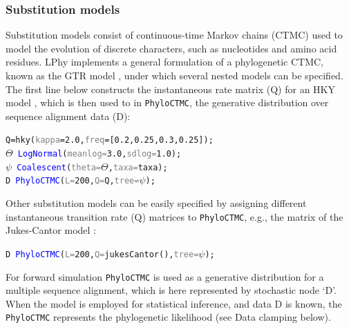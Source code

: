 \documentclass[10pt,letterpaper,table]{article}
\theoremstyle{definition}
\begin{document}
\subsubsection{Substitution models}
Substitution models consist of continuous-time Markov chains (CTMC) used to model the evolution of discrete characters, such as nucleotides and amino acid residues. 
LPhy implements a general formulation of a phylogenetic CTMC, known as the GTR model \cite{gtr}, under which several nested models can be specified. 
The first line below constructs the instantaneous rate matrix (Q) for an HKY model \cite{hasegawa1985dating}, which is then used to in \texttt{PhyloCTMC}, the generative distribution over sequence alignment data (D):

{
  \small
  \begin{listing}
    \begin{alltt}
    Q = \textcolor{generator}{hky}(\textcolor{gray}{kappa}=\textcolor{constant}{2.0}, \textcolor{gray}{freq}=[\textcolor{constant}{0.2}, \textcolor{constant}{0.25}, \textcolor{constant}{0.3}, \textcolor{constant}{0.25}]);
    \textcolor{bluishgreen}{\(\Theta\)} ~ \textcolor{blue}{LogNormal}(\textcolor{gray}{meanlog=}\textcolor{constant}{3.0}, \textcolor{gray}{sdlog=}\textcolor{constant}{1.0});
    \textcolor{bluishgreen}{\(\psi\)} ~ \textcolor{blue}{Coalescent}(\textcolor{gray}{theta=}\textcolor{bluishgreen}{\(\Theta\)}, \textcolor{gray}{taxa=}taxa);
    \textcolor{bluishgreen}{D} ~ \textcolor{blue}{PhyloCTMC}(\textcolor{gray}{L=}\textcolor{constant}{200}, \textcolor{gray}{Q=}Q, \textcolor{gray}{tree=}\textcolor{bluishgreen}{\(\psi\)});
    \end{alltt}
  \end{listing}
}

Other substitution models can be easily specified by assigning different instantaneous transition rate (Q) matrices to \texttt{PhyloCTMC}, e.g., the matrix of the Jukes-Cantor model \cite{jc69}:
{
  \small
  \begin{listing}
    \begin{alltt}
    \textcolor{bluishgreen}{D} ~ \textcolor{blue}{PhyloCTMC}(\textcolor{gray}{L=}\textcolor{constant}{200}, \textcolor{gray}{Q=}\textcolor{generator}{jukesCantor}(), \textcolor{gray}{tree=}\textcolor{bluishgreen}{\(\psi\)});
    \end{alltt}
  \end{listing}
}

For forward simulation \texttt{PhyloCTMC} is used as a generative distribution for a multiple sequence alignment, which is here represented by stochastic node `D'. When the model is employed for statistical inference, and data D is known, the \texttt{PhyloCTMC} represents the phylogenetic likelihood (see Data clamping below).
\end{document}
